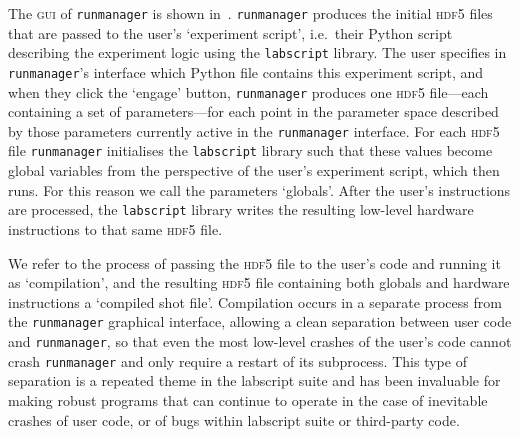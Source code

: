 The \textsc{gui} of \texttt{runmanager} is shown in~. \texttt{runmanager} produces the initial \textsc{hdf5} files that are passed to the user's `experiment script', i.e.~their Python script describing the experiment logic using the \texttt{labscript} library. The user specifies in \texttt{runmanager}'s interface which Python file contains this experiment script, and when they click the `engage' button, \texttt{runmanager} produces one \textsc{hdf5} file---each containing a set of parameters---for each point in the parameter space described by those parameters currently active in the \texttt{runmanager} interface. For each \textsc{hdf5} file \texttt{runmanager} initialises the \texttt{labscript} library such that these values become global variables from the perspective of the user's experiment script, which then runs. For this reason we call the parameters `globals'. After the user's instructions are processed, the \texttt{labscript} library writes the resulting low-level hardware instructions to that same \textsc{hdf5} file.

We refer to the process of passing the \textsc{hdf5} file to the user's code and running it as `compilation', and the resulting \textsc{hdf5} file containing both globals and hardware instructions a `compiled shot file'. Compilation occurs in a separate process from the \texttt{runmanager} graphical interface, allowing a clean separation between user code and \texttt{runmanager}, so that even the most low-level crashes of the user's code cannot crash \texttt{runmanager} and only require a restart of its subprocess. This type of separation is a repeated theme in the labscript suite and has been invaluable for making robust programs that can continue to operate in the case of inevitable crashes of user code, or of bugs within labscript suite or third-party code.

